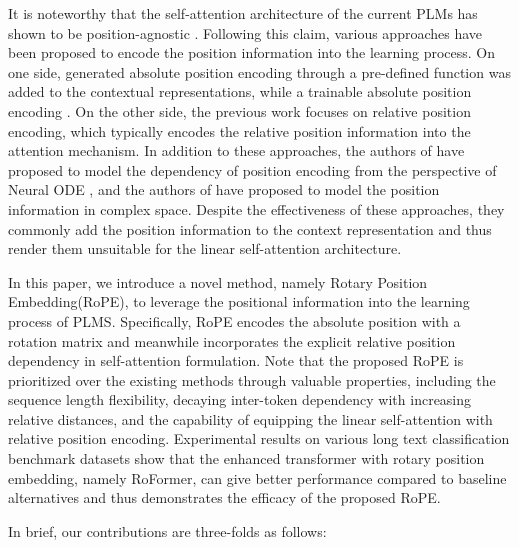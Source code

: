 It is noteworthy that the self-attention architecture of the current PLMs has shown to be position-agnostic \cite{Yun2020Are}. Following this claim, various approaches have been proposed to encode the position information into the learning process. On one side, generated absolute position encoding through a pre-defined function \cite{Vaswani:2017} was added to the contextual representations, while a trainable absolute position encoding \cite{Gehring:2017,Devlin2019BERTPO,Lan2020ALBERT:2020,clark2020electra,Radford2019LanguageMA,Radford2018ImprovingLU:2018}. On the other side, the previous work \cite{Parikh2016ADA,Shaw2018SelfAttentionWR,Huang2018MusicT,Dai2019TransformerXLAL,Yang2019XLNetGA,Raffel2020ExploringTL,Ke2020RethinkingPE,He2020DeBERTaDB,huang-etal-2020-improve} focuses on relative position encoding, which typically encodes the relative position information into the attention mechanism. In addition to these approaches, the authors of \cite{LiuYDH:2020} have proposed to model the dependency of position encoding from the perspective of Neural ODE \cite{ChenRBD:2018}, and the authors of \cite{Wang2020Encoding} have proposed to model the position information in complex space. Despite the effectiveness of these approaches, they commonly add the position information to the context representation and thus render them unsuitable for the linear self-attention architecture.

In this paper, we introduce a novel method, namely Rotary Position Embedding(RoPE), to leverage the positional information into the learning process of PLMS. Specifically, RoPE encodes the absolute position with a rotation matrix and meanwhile incorporates the explicit relative position dependency in self-attention formulation. Note that the proposed RoPE is prioritized over the existing methods through valuable properties, including the sequence length flexibility, decaying inter-token dependency with increasing relative distances, and the capability of equipping the linear self-attention with relative position encoding. Experimental results on various long text classification benchmark datasets show that the enhanced transformer with rotary position embedding, namely RoFormer, can give better performance compared to baseline alternatives and thus demonstrates the efficacy of the proposed RoPE.

In brief, our contributions are three-folds as follows:

